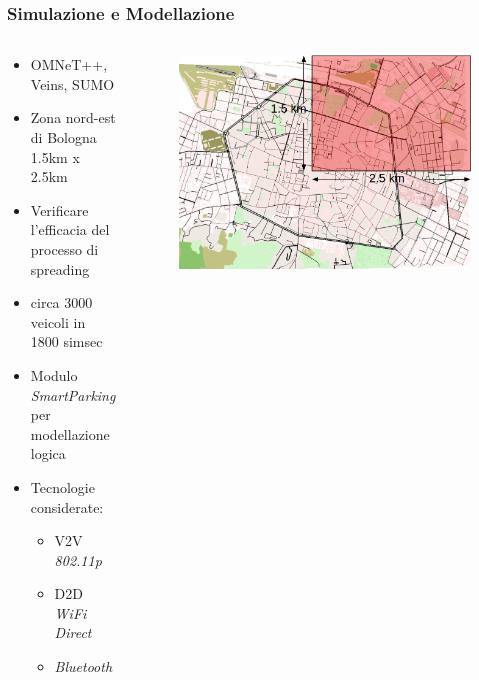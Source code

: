 \documentclass{beamer}
\begin{document}
\begin{frame}
  \frametitle{Simulazione e Modellazione}
  \begin{columns}
    \begin{column}{0.65\textwidth}
      \begin{itemize}
	\item OMNeT++, Veins, SUMO
	\item Zona nord-est di Bologna 1.5km x 2.5km
	\item Verificare l’efficacia del processo di spreading
	\item circa 3000 veicoli in 1800 simsec
	\item Modulo \textit{SmartParking} per modellazione logica
	\item Tecnologie considerate: 
	  \begin{itemize}
	    \item V2V \textit{802.11p}
	    \item D2D \textit{WiFi Direct} 
	    \item \textit{Bluetooth}
	  \end{itemize}
      \end{itemize}
    \end{column}

    \begin{column}{0.35\textwidth}
      \begin{figure}
      \includegraphics[width=\columnwidth]{img/sumo-bolo2.png}
      \end{figure}
    \end{column}
  \end{columns}
\end{frame}
\end{document}

